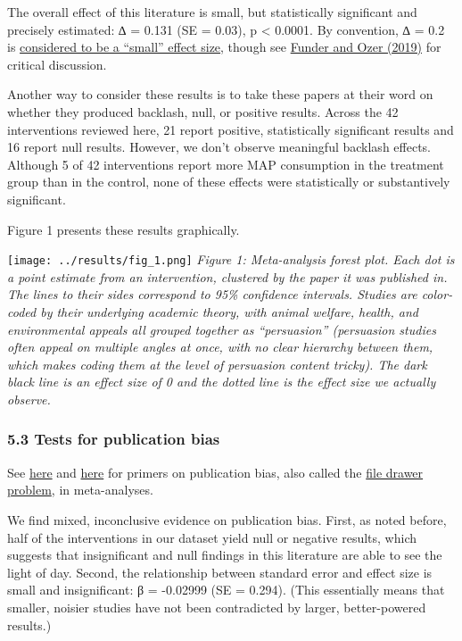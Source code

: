 \documentclass[
  letterpaper,
  DIV=11,
  numbers=noendperiod]{scrartcl}
\begin{document}
The overall effect of this literature is small, but statistically
significant and precisely estimated: ∆ = 0.131 (SE = 0.03), p
\textless{} 0.0001. By convention, ∆ = 0.2 is
\href{https://www.ncbi.nlm.nih.gov/pmc/articles/PMC3444174/}{considered
to be a ``small'' effect size}, though see
\href{https://journals.sagepub.com/doi/10.1177/2515245919847202}{Funder
and Ozer (2019)} for critical discussion.

Another way to consider these results is to take these papers at their
word on whether they produced backlash, null, or positive results.
Across the 42 interventions reviewed here, 21 report positive,
statistically significant results and 16 report null results. However,
we don't observe meaningful backlash effects. Although 5 of 42
interventions report more MAP consumption in the treatment group than in
the control, none of these effects were statistically or substantively
significant.

Figure 1 presents these results graphically.

\texttt{[image: ../results/fig\_1.png]} \emph{Figure 1: Meta-analysis
forest plot. Each dot is a point estimate from an intervention,
clustered by the paper it was published in. The lines to their sides
correspond to 95\% confidence intervals. Studies are color-coded by
their underlying academic theory, with animal welfare, health, and
environmental appeals all grouped together as ``persuasion'' (persuasion
studies often appeal on multiple angles at once, with no clear hierarchy
between them, which makes coding them at the level of persuasion content
tricky). The dark black line is an effect size of 0 and the dotted line
is the effect size we actually observe.}

\hypertarget{tests-for-publication-bias}{%
\subsubsection{5.3 Tests for publication
bias}\label{tests-for-publication-bias}}

See
\href{https://bookdown.org/MathiasHarrer/Doing_Meta_Analysis_in_R/pub-bias.html}{here}
and \href{https://pubmed.ncbi.nlm.nih.gov/29141096/}{here} for primers
on publication bias, also called the
\href{https://psycnet.apa.org/record/1979-27602-001}{file drawer
problem}, in meta-analyses.

We find mixed, inconclusive evidence on publication bias. First, as
noted before, half of the interventions in our dataset yield null or
negative results, which suggests that insignificant and null findings in
this literature are able to see the light of day. Second, the
relationship between standard error and effect size is small and
insignificant: β = -0.02999 (SE = 0.294). (This essentially means that
smaller, noisier studies have not been contradicted by larger,
better-powered results.)
\end{document}
